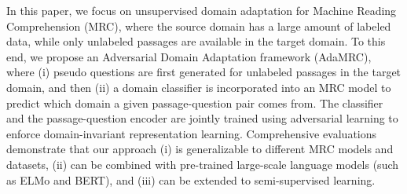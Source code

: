 In this paper, we focus on unsupervised domain adaptation for Machine Reading Comprehension (MRC), where the source domain has a large amount of labeled data, while only unlabeled passages are available in the target domain. To this end, we propose an Adversarial Domain Adaptation framework (AdaMRC), where (i) pseudo questions are first generated for unlabeled passages in the target domain, and then (ii) a domain classifier is incorporated into an MRC model to predict which domain a given passage-question pair comes from. The classifier and the passage-question encoder are jointly trained using adversarial learning to enforce domain-invariant representation learning. Comprehensive evaluations demonstrate that our approach (i) is generalizable to different MRC models and datasets, (ii) can be combined with pre-trained large-scale language models (such as ELMo and BERT), and (iii) can be extended to semi-supervised learning.
